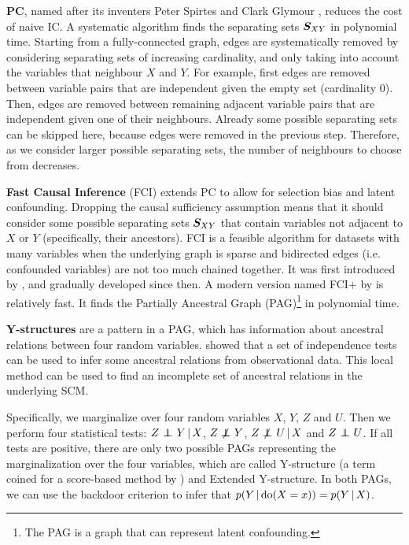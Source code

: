 \textbf{PC}, named after its inventers Peter Spirtes and Clark Glymour \citep{spirtes1991algorithm}, reduces the cost of naive IC. A systematic algorithm finds the separating sets $\bm{S}_{XY}$ in polynomial time. Starting from a fully-connected graph, edges are systematically removed by considering separating sets of increasing cardinality, and only taking into account the variables that neighbour $X$ and $Y$. For example, first edges are removed between variable pairs that are independent given the empty set (cardinality 0). Then, edges are removed between remaining adjacent variable pairs that are independent given one of their neighbours. Already some possible separating sets can be skipped here, because edges were removed in the previous step. Therefore, as we consider larger possible separating sets, the number of neighbours to choose from decreases.

\textbf{Fast Causal Inference} (FCI) extends PC to allow for selection bias and latent confounding. Dropping the causal sufficiency assumption means that it should consider some possible separating sets $\bm{S}_{XY}$ that contain variables not adjacent to $X$ or $Y$ (specifically, their ancestors). FCI is a feasible algorithm for datasets with many variables when the underlying graph is sparse and bidirected edges (i.e. confounded variables) are not too much chained together. It was first introduced by \citet{spirtes1999algorithm}, and gradually developed since then. A modern version named FCI+ by \citet{claassen2013learning} is relatively fast. It finds the Partially Ancestral Graph (PAG)\footnote{The PAG is a graph that can represent latent confounding.} in polynomial time.
          
\textbf{Y-structures} are a pattern in a PAG, which has information about ancestral relations between four random variables. \citet{mooij2015empirical} showed that a set of independence tests can be used to infer some ancestral relations from observational data. This local method can be used to find an incomplete set of ancestral relations in the underlying SCM. 

Specifically, we marginalize over four random variables $X$, $Y$, $Z$ and $U$. Then we perform four statistical tests: ${Z} \operatorname*{{\,\perp\mkern-12mu\perp\,}}_{} {Y} \,|\, {X}$, $Z \operatorname*{{\,\not\mkern-1mu\perp\mkern-12mu\perp\,}} Y$, ${Z} \operatorname*{{\,\not\mkern-1mu\perp\mkern-12mu\perp\,}}_{} {U} \,|\, {X}$ and $Z \operatorname*{{\,\perp\mkern-12mu\perp\,}} U$. If all tests are positive, there are only two possible PAGs representing the marginalization over the four variables, which are called Y-structure (a term coined for a score-based method by \citet{mani2006bayesian}) and Extended Y-structure. In both PAGs, we can use the backdoor criterion \citep{pearl2009causality} to infer that $p(Y\,|\, \mathrm{do}(X=x))=p(Y\,|\, X)$.

